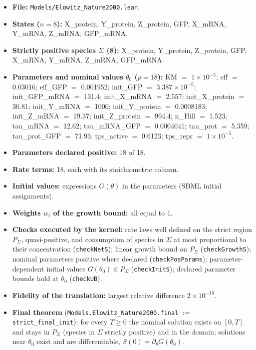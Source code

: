 \begin{itemize}\itemsep0pt\small
\item \textbf{File:} \texttt{Models/Elowitz\_Nature2000.lean}.
\item \textbf{States ($n=8$):} X\_protein, Y\_protein, Z\_protein, GFP, X\_mRNA, Y\_mRNA, Z\_mRNA, GFP\_mRNA.
\item \textbf{Strictly positive species $\Sigma$ (8):} X\_protein, Y\_protein, Z\_protein, GFP, X\_mRNA, Y\_mRNA, Z\_mRNA, GFP\_mRNA.
\item \textbf{Parameters and nominal values $\theta_0$ ($p=18$):} KM $=$ $1\times10^{-5}$; eff $=$ 0.03016; eff\_GFP $=$ 0.001952; init\_GFP $=$ $3.387\times10^{-5}$; init\_GFP\_mRNA $=$ 131.4; init\_X\_mRNA $=$ 2.557; init\_X\_protein $=$ 30.81; init\_Y\_mRNA $=$ 1000; init\_Y\_protein $=$ 0.0008183; init\_Z\_mRNA $=$ 19.37; init\_Z\_protein $=$ 994.4; n\_Hill $=$ 1.523; tau\_mRNA $=$ 12.62; tau\_mRNA\_GFP $=$ 0.0004041; tau\_prot $=$ 5.359; tau\_prot\_GFP $=$ 71.93; tps\_active $=$ 0.6123; tps\_repr $=$ $1\times10^{-5}$.
\item \textbf{Parameters declared positive:} 18 of 18.
\item \textbf{Rate terms:} 18, each with its stoichiometric column.
\item \textbf{Initial values:} expressions $G(\theta)$ in the parameters (SBML initial assignments).
\item \textbf{Weights $w_i$ of the growth bound:} all equal to 1.
\item \textbf{Checks executed by the kernel:} rate laws well defined on the strict region $P_\Sigma$, quasi-positive, and consumption of species in $\Sigma$ at most proportional to their concentration (\texttt{checkNetS}); linear growth bound on $P_\Sigma$ (\texttt{checkGrowthS}); nominal parameters positive where declared (\texttt{checkPosParams}); parameter-dependent initial values $G(\theta_0)\in P_\Sigma$ (\texttt{checkInitS}); declared parameter bounds hold at $\theta_0$ (\texttt{checkUB}).
\item \textbf{Fidelity of the translation:} largest relative difference $2\times10^{-16}$.
\item \textbf{Final theorem} (\texttt{Models.Elowitz\_Nature2000.final} $:=$ \texttt{strict\_final\_init}): for every $T\ge0$ the nominal solution exists on $[0,T]$ and stays in $P_\Sigma$ (species in $\Sigma$ strictly positive) and in the domain; solutions near $\theta_0$ exist and are differentiable, $S(0)=\partial_\theta G(\theta_0)$.
\end{itemize}

